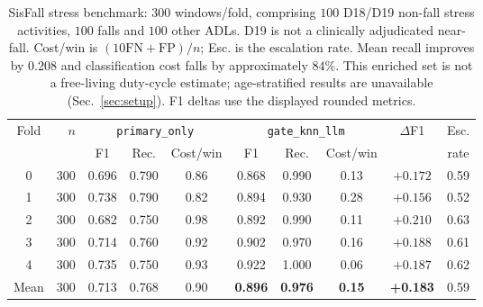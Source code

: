 \begin{table}[!t]
\centering
\caption{SisFall stress benchmark: $300$ windows/fold, comprising $100$ D18/D19 non-fall stress activities, $100$ falls and $100$ other ADLs. D19 is not a clinically adjudicated near-fall. Cost/win is $(10\mathrm{FN}+\mathrm{FP})/n$; Esc. is the escalation rate. Mean recall improves by $0.208$ and classification cost falls by approximately $84\%$. This enriched set is not a free-living duty-cycle estimate; age-stratified results are unavailable (Sec.~\ref{sec:setup}). F1 deltas use the displayed rounded metrics.}
\label{tab:ambiguoussisfall}
\begin{tabular}{c r ccc ccc cc}
\toprule
Fold & $n$ & \multicolumn{3}{c}{\texttt{primary\_only}} & \multicolumn{3}{c}{\texttt{gate\_knn\_llm}} & $\Delta$F1 & Esc. \\
\cmidrule(lr){3-5}\cmidrule(lr){6-8}
 & & F1 & Rec. & Cost/win & F1 & Rec. & Cost/win & & rate \\
\midrule
0 & 300 & 0.696 & 0.790 & 0.86 & 0.868 & 0.990 & 0.13 & $+0.172$ & 0.59 \\
1 & 300 & 0.738 & 0.790 & 0.82 & 0.894 & 0.930 & 0.28 & $+0.156$ & 0.52 \\
2 & 300 & 0.682 & 0.750 & 0.98 & 0.892 & 0.990 & 0.11 & $+0.210$ & 0.63 \\
3 & 300 & 0.714 & 0.760 & 0.92 & 0.902 & 0.970 & 0.16 & $+0.188$ & 0.61 \\
4 & 300 & 0.735 & 0.750 & 0.93 & 0.922 & 1.000 & 0.06 & $+0.187$ & 0.62 \\
\midrule
Mean & 300 & 0.713 & 0.768 & 0.90 & \textbf{0.896} & \textbf{0.976} & \textbf{0.15} & \textbf{+0.183} & 0.59 \\
\bottomrule
\end{tabular}
\end{table}
